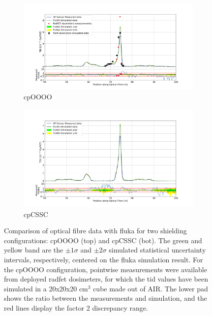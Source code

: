 \documentclass[encoding=utf8,british]{tumphthesis}
\begin{document}
\begin{figure}[H]
    \centering
    \begin{subfigure}{0.8\textwidth}
      \includegraphics[width=\linewidth]{results/optical_fibre_benchmark_cpOOOO_with_point_dosimeters.png}
      \caption{cpOOOO}
      \label{fig:benchmark-opticalfibre-cpOOOO}
    \end{subfigure}
    \hfil 
    \begin{subfigure}{0.8\textwidth}
      \includegraphics[width=\linewidth]{results/optical_fibre_benchmark_cpCSSC.png}
      \caption{cpCSSC}
      \label{fig:benchmark-opticalfibre-cpCSSC}
    \end{subfigure}

    \caption{Comparison of optical fibre data with \acrshort{fluka} for two shielding configurations: cpOOOO (top) and cpCSSC (bot). The green and yellow band are the $\pm1\sigma$ and $\pm2\sigma$ simulated statistical uncertainty intervals, respectively, centered on the \acrshort{fluka} simulation result. For the cpOOOO configuration, pointwise measurements were available from deployed \acrshort{radfet} dosimeters, for which the \acrshort{tid} values have been simulated in a 20x20x20 cm$^3$ cube made out of AIR. The lower pad shows the ratio between the measurements and simulation, and the red lines display the factor 2 discrepancy range.}
    \label{fig:benchmark-optical-fibre}
\end{figure}
\end{document}
